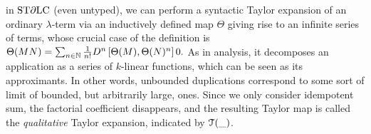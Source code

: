 in $\mathrm{ST}\partial\mathrm{LC}$ (even untyped), we can perform a syntactic Taylor expansion of an ordinary $\lambda$-term via an inductively defined map $\Theta$ giving rise to an infinite series of terms, whose crucial case of the definition is
$
\Theta(MN)=\sum_{n\in\mathbb{N}}\frac{1}{n!}\Der^n\left[\Theta(M),\Theta(N)^n\right]0.
$
As in analysis, it decomposes an application as a series of $k$-linear functions, which can be seen as its approximants.
In other words, unbounded duplications correspond to some sort of limit of bounded, but arbitrarily large, ones.
Since we only consider idempotent sum, the factorial coefficient disappears, and the resulting Taylor map is called the \emph{qualitative} Taylor expansion, indicated by $\mathcal{T}(\_)$. 







